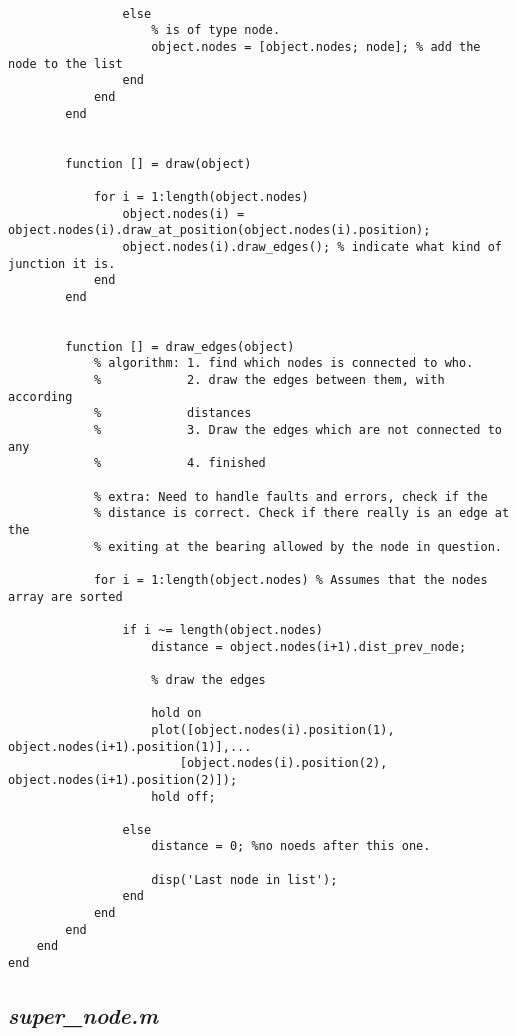 \begin{lstlisting}
                                    
                else
                    % is of type node.
                    object.nodes = [object.nodes; node]; % add the node to the list
                end 
            end
        end
              
                
        function [] = draw(object)
            
            for i = 1:length(object.nodes)
                object.nodes(i) = object.nodes(i).draw_at_position(object.nodes(i).position);
                object.nodes(i).draw_edges(); % indicate what kind of junction it is.
            end
        end
        
        
        function [] = draw_edges(object)
            % algorithm: 1. find which nodes is connected to who.
            %            2. draw the edges between them, with according
            %            distances
            %            3. Draw the edges which are not connected to any
            %            4. finished
            
            % extra: Need to handle faults and errors, check if the
            % distance is correct. Check if there really is an edge at the
            % exiting at the bearing allowed by the node in question.
            
            for i = 1:length(object.nodes) % Assumes that the nodes array are sorted 
           
                if i ~= length(object.nodes)
                    distance = object.nodes(i+1).dist_prev_node;
                    
                    % draw the edges
                    
                    hold on
                    plot([object.nodes(i).position(1), object.nodes(i+1).position(1)],...
                        [object.nodes(i).position(2), object.nodes(i+1).position(2)]);
                    hold off;
                                        
                else
                    distance = 0; %no noeds after this one.
                    
                    disp('Last node in list');
                end
            end
        end
    end
end

\end{lstlisting}


\subsection{\emph{super\_node.m}}

